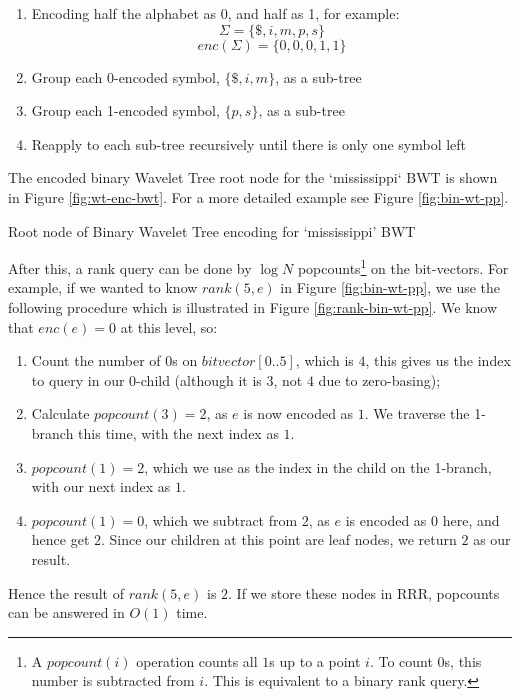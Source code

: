 \begin{enumerate}
    \item
		Encoding half the alphabet as 0, and half as 1, for example:
    		$$\Sigma = \{ \$, i, m, p, s \}$$
			$$enc(\Sigma) = \{ 0, 0, 0, 1, 1 \}$$
    \item
		Group each 0-encoded symbol, $\{ \$, i, m \}$, as a sub-tree
    \item
		Group each 1-encoded symbol, $\{ p, s \}$, as a sub-tree
    \item
		Reapply to each sub-tree recursively until there is only one symbol
    	left
\end{enumerate}

The encoded binary Wavelet Tree root node for the `mississippi` BWT is shown in Figure \ref{fig:wt-enc-bwt}. For a more detailed example see Figure \ref{fig:bin-wt-pp}.


			{Root node of Binary Wavelet Tree encoding for `mississippi' BWT}


After this, a rank query can be done by $\log N$ popcounts\footnote{A
$popcount(i)$ operation counts all $1$s up to a point $i$. To count $0$s, this
number is subtracted from $i$. This is equivalent to a binary rank query.} on 
the bit-vectors. For example, if we wanted to know $rank(5, e)$ in Figure 
\ref{fig:bin-wt-pp}, we use the following procedure which is illustrated in 
Figure \ref{fig:rank-bin-wt-pp}. 
We know that $enc(e) = 0$ at this level, so:

\begin{enumerate}
    \item
		Count the number of $0$s on $bitvector[0..5]$, which is $4$, this
   		gives us the index to query in our 0-child (although it is $3$, not $4$ 
		due to zero-basing);
    \item
		Calculate $popcount(3) = 2$, as $e$ is now encoded as $1$. We traverse
    	the 1-branch this time, with the next index as $1$.
    \item
		$popcount(1) = 2$, which we use as the index in the child on the
    	1-branch, with our next index as $1$.
    \item
		$popcount(1) = 0$, which we subtract from $2$, as $e$ is encoded as
    	$0$ here, and hence get $2$. Since our children at this point are leaf
    	nodes, we return $2$ as our result.
\end{enumerate}

Hence the result of $rank(5, e)$ is $2$. If we store these nodes in RRR, 
popcounts can be answered in $O(1)$ time.

